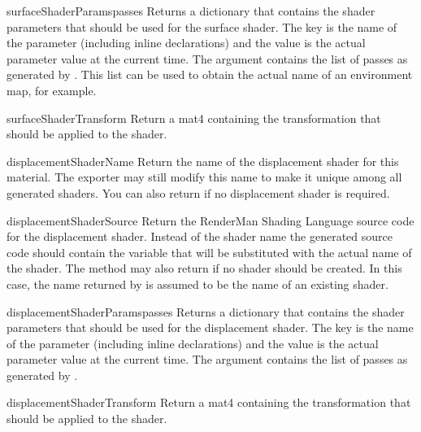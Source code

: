 \begin{methoddesc}[IMaterial]{surfaceShaderParams}{passes}
Returns a dictionary that contains the shader parameters that should
be used for the surface shader. The key is the name of the parameter
(including inline declarations) and the value is the actual parameter
value at the current time. The  argument contains the list
of passes as generated by . This list can be
used to obtain the actual name of an environment map, for example.
\end{methoddesc}

\begin{methoddesc}[IMaterial]{surfaceShaderTransform}{}
Return a mat4 containing the transformation that should be applied to
the shader.
\end{methoddesc}

\begin{methoddesc}[IMaterial]{displacementShaderName}{}
Return the name of the displacement shader for this material. The exporter
may still modify this name to make it unique among all generated
shaders. You can also return  if no displacement shader is required.
\end{methoddesc}

\begin{methoddesc}[IMaterial]{displacementShaderSource}{}
Return the RenderMan Shading Language source code for the displacement shader.
Instead of the shader name the generated source code should contain
the variable  that will be substituted with the
actual name of the shader. The method may also return  if
no shader should be created. In this case, the name returned by
 is assumed to be the name of an existing 
shader.
\end{methoddesc}

\begin{methoddesc}[IMaterial]{displacementShaderParams}{passes}
Returns a dictionary that contains the shader parameters that should
be used for the displacement shader. The key is the name of the parameter
(including inline declarations) and the value is the actual parameter
value at the current time. The  argument contains the list
of passes as generated by .
\end{methoddesc}

\begin{methoddesc}[IMaterial]{displacementShaderTransform}{}
Return a mat4 containing the transformation that should be applied to
the shader.
\end{methoddesc}

